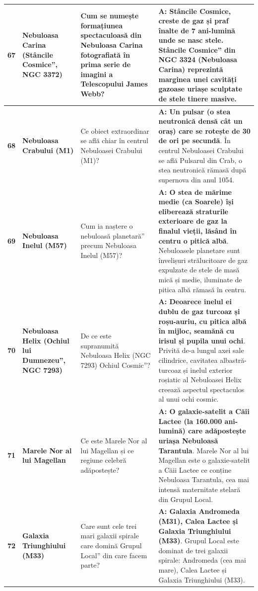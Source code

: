 \begin{longtable}{@{}r >{\raggedright\arraybackslash}p{2.7cm} >{\raggedright\arraybackslash}p{4.8cm} >{\raggedright\arraybackslash}p{6.5cm}@{}}
\textbf{67} & \textbf{Nebuloasa Carina (\quotedblbase{}Stâncile Cosmice\textquotedblright{}, NGC 3372)} & Cum se numește formațiunea spectaculoasă din Nebuloasa Carina fotografiată în prima serie de imagini a Telescopului James Webb? & \textbf{A: Stâncile Cosmice, creste de gaz și praf înalte de 7 ani-lumină unde se nasc stele}. {\footnotesize \quotedblbase{}Stâncile Cosmice\textquotedblright{} din NGC 3324 (Nebuloasa Carina) reprezintă marginea unei cavități gazoase uriașe sculptate de stele tinere masive.} \\ \midrule
\textbf{68} & \textbf{Nebuloasa Crabului (M1)} & Ce obiect extraordinar se află chiar în centrul Nebuloasei Crabului (M1)? & \textbf{A: Un pulsar (o stea neutronică densă cât un oraș) care se rotește de 30 de ori pe secundă}. {\footnotesize În centrul Nebuloasei Crabului se află Pulsarul din Crab, o stea neutronică rămasă după supernova din anul 1054.} \\ \midrule
\textbf{69} & \textbf{Nebuloasa Inelul (M57)} & Cum ia naștere o \quotedblbase{}nebuloasă planetară\textquotedblright{} precum Nebuloasa Inelul (M57)? & \textbf{A: O stea de mărime medie (ca Soarele) își eliberează straturile exterioare de gaz la finalul vieții, lăsând în centru o pitică albă}. {\footnotesize Nebuloasele planetare sunt învelișuri strălucitoare de gaz expulzate de stele de masă mică și medie, iluminate de pitica albă rămasă în centru.} \\ \midrule
\textbf{70} & \textbf{Nebuloasa Helix (\quotedblbase{}Ochiul lui Dumnezeu\textquotedblright{}, NGC 7293)} & De ce este supranumită Nebuloasa Helix (NGC 7293) \quotedblbase{}Ochiul Cosmic\textquotedblright{}? & \textbf{A: Deoarece inelul ei dublu de gaz turcoaz și roșu-auriu, cu pitica albă în mijloc, seamănă cu irisul și pupila unui ochi}. {\footnotesize Privită de-a lungul axei sale cilindrice, cavitatea albastră-turcoaz și inelul exterior roșiatic al Nebuloasei Helix creează aspectul spectaculos al unui ochi cosmic.} \\ \midrule
\textbf{71} & \textbf{Marele Nor al lui Magellan} & Ce este Marele Nor al lui Magellan și ce regiune celebră adăpostește? & \textbf{A: O galaxie-satelit a Căii Lactee (la 160.000 ani-lumină) care adăpostește uriașa Nebuloasă Tarantula}. {\footnotesize Marele Nor al lui Magellan este o galaxie-satelit a Căii Lactee ce conține Nebuloasa Tarantula, cea mai intensă maternitate stelară din Grupul Local.} \\ \midrule
\textbf{72} & \textbf{Galaxia Triunghiului (M33)} & Care sunt cele trei mari galaxii spirale care domină \quotedblbase{}Grupul Local\textquotedblright{} din care facem parte? & \textbf{A: Galaxia Andromeda (M31), Calea Lactee și Galaxia Triunghiului (M33)}. {\footnotesize Grupul Local este dominat de trei galaxii spirale: Andromeda (cea mai mare), Calea Lactee și Galaxia Triunghiului (M33).} \\ \midrule

\end{longtable}
